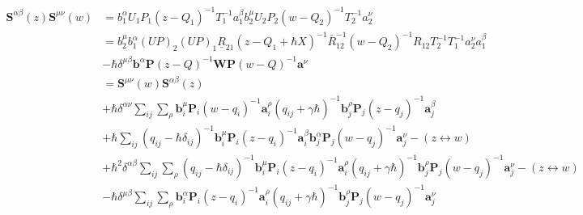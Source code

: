 \documentclass[11pt]{report}
\theoremstyle{definition}
\theoremstyle{remark}
\theoremstyle{remark}
\begin{document}
\begin{align*}
\mathbf{S}^{\alpha\beta}(z) \mathbf{S}^{\mu\nu}(w)
&= b_1^\alpha U_1 P_1 (z-Q_1)^{-1} T_1^{-1} a_1^\beta b_2^\mu U_2 P_2 (w-Q_2)^{-1} T_2^{-1} a_2^\nu \\
&= b_2^\mu b_1^\alpha (UP)_2 (UP)_1 \underline{R}_{21} (z-Q_1+\hbar X)^{-1} \bar R_{12}^{-1} (w-Q_2)^{-1} R_{12} T_2^{-1} T_1^{-1} a_2^\nu a_1^\beta \\
&- \hbar \delta^{\mu\beta} \mathbf{b}^\alpha \mathbf{P} (z-Q)^{-1} \mathbf{W} \mathbf{P} (w-Q)^{-1} \mathbf{a}^\nu \\
&= \mathbf{S}^{\mu\nu}(w) \mathbf{S}^{\alpha\beta}(z) \\
&+ \hbar \delta^{\alpha\nu} \sum_{ij} \sum_\rho \mathbf{b}_i^\mu \mathbf{P}_i (w-q_i)^{-1} \mathbf{a}_i^\rho (q_{ij}+\gamma\hbar)^{-1} \mathbf{b}_j^\rho \mathbf{P}_j (z-q_j)^{-1} \mathbf{a}_j^\beta \\
&+ \hbar \sum_{ij} (q_{ij}-\hbar \delta_{ij})^{-1} \mathbf{b}_i^\mu \mathbf{P}_i (z-q_i)^{-1} \mathbf{a}_i^\beta \mathbf{b}_j^\alpha \mathbf{P}_j (w-q_j)^{-1} \mathbf{a}_j^\nu - (z \leftrightarrow w) \\
&+ \hbar^2 \delta^{\alpha\beta} \sum_{ij} \sum_\rho (q_{ij}-\hbar \delta_{ij})^{-1} \mathbf{b}_i^\mu \mathbf{P}_i (z-q_i)^{-1} \mathbf{a}_i^\rho (q_{ij}+\gamma\hbar)^{-1} \mathbf{b}_j^\rho \mathbf{P}_j (w-q_j)^{-1} \mathbf{a}_j^\nu - (z \leftrightarrow w) \\
&- \hbar \delta^{\mu\beta} \sum_{ij} \sum_\rho \mathbf{b}_i^\alpha \mathbf{P}_i (z-q_i)^{-1} \mathbf{a}_i^\rho (q_{ij}+\gamma\hbar)^{-1} \mathbf{b}_j^\rho \mathbf{P}_j (w-q_j)^{-1} \mathbf{a}_j^\nu
\end{align*}
\end{document}
